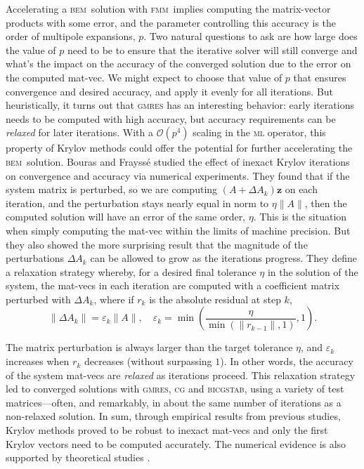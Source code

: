 \documentclass[smallcondensed,final]{svjour3}
\newcommand{\bem}{\textsc{bem}\xspace}
\newcommand{\fmm}{\textsc{fmm}\xspace}
\renewcommand{\O}[1]{\mathcal{O}(#1)}
\newcommand{\mtol}{\textsc{m}\texttwooldstyle\textsc{l}\xspace} %
\newcommand{\gmres}{\textsc{gmres}\xspace}
\newcommand{\vect}[1]{\mathbf{#1}}
\begin{document}
Accelerating a \bem\ solution with \fmm\ implies computing the matrix-vector products with some error, and the parameter controlling this accuracy is the order of multipole expansions, $p$. 
Two natural questions to ask are how large does the value of $p$ need to be to ensure that the iterative solver will still converge and what's the impact on the accuracy of the converged solution due to the error on the computed mat-vec.
We might expect to choose that value of $p$ that ensures convergence and desired accuracy, and apply it evenly for all iterations. 
But heuristically, it turns out that \gmres has an interesting behavior: early iterations needs to be computed with high accuracy, but accuracy requirements can be \emph{relaxed} for later iterations. 
With a $\O{p^{4}}$ scaling in the \mtol operator, this property of Krylov methods could offer the potential for further accelerating the \bem\ solution.
Bouras and Frayss{\'e} \cite{bouras2000relaxation,bourasfraysse2005} studied the effect of inexact Krylov iterations on convergence and accuracy via numerical experiments.
They found that if the system matrix is perturbed, so we are computing $(A+\Delta A_k)\vect{z}$ on each iteration, and the perturbation stays nearly equal in norm to $\eta \|A\|$, then the computed solution will have an error of the same order, $\eta$. This is the situation when simply computing the mat-vec within the limits of machine precision. But they also showed the more surprising result that the magnitude of the perturbations $\Delta A_k$ can be allowed to grow as the iterations progress.
They define a relaxation strategy whereby, for a desired final tolerance $\eta$ in the solution of the system, the mat-vecs in each iteration are computed with a coefficient matrix perturbed with $\Delta A_k$, where if $r_k$ is the absolute residual at step $k$,
%
\begin{equation}\label{eqn:matrix-perturbation}
  \|\Delta A_k\| = \varepsilon_k\|A\|, \quad \varepsilon_k=\min\left( \frac{\eta}{\min(\|r_{k-1}\|,1)}, 1\right).
\end{equation}

\noindent The matrix perturbation is always larger than the target tolerance $\eta$, and $\varepsilon_k$ increases when $r_k$ decreases (without surpassing $1$). In other words, the accuracy of the system mat-vecs are \emph{relaxed} as iterations proceed. This relaxation strategy led to converged solutions with \gmres, \textsc{cg} and \textsc{bicgstab}, using a variety of test matrices---often, and remarkably, in about the same number of iterations as a non-relaxed solution. In sum, through empirical results from previous studies, Krylov methods proved to be robust to inexact mat-vecs and only the first Krylov vectors need to be computed accurately.
The numerical evidence is also supported by theoretical studies \cite{simonciniszyld2003,vandeneshofsleijpen2004}.
\end{document}
